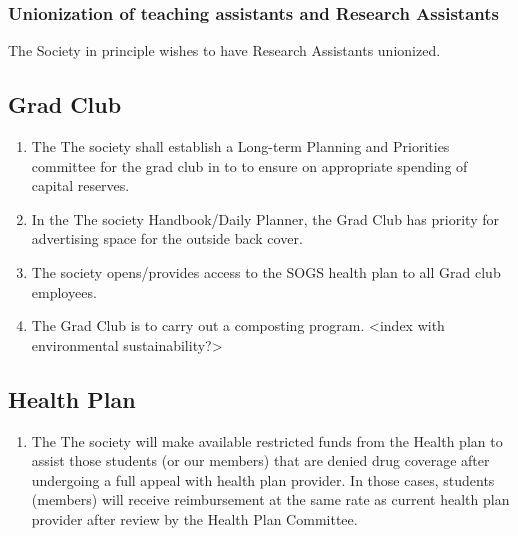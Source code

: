 \subsubsection{Unionization of teaching assistants and Research Assistants}
\begin{longenum}[ label*=\thesubsubsection.\arabic*., align=left]
\item 	The Society in principle wishes to have Research Assistants unionized.
\end{longenum}


\subsection{Grad Club}
\begin{enumerate}
\item The The society shall establish a Long-term Planning and Priorities committee for the grad club in to to ensure on appropriate spending of capital reserves.   
\item In the The society Handbook/Daily Planner, the Grad Club has priority for advertising space for the outside back cover.  
\item The society opens/provides access to the SOGS health plan to all Grad club employees.  
\item The Grad Club is to carry out a composting program. <index with environmental sustainability?>   
\end{enumerate}

\subsection{Health Plan}
\begin{enumerate}
\item  The The society will make available restricted funds from the Health plan to assist those students (or our members) that are denied drug coverage after undergoing a full appeal with health plan provider.  In those cases, students (members) will receive reimbursement at the same rate as current health plan provider after review by the Health Plan Committee.  
\end{enumerate}


